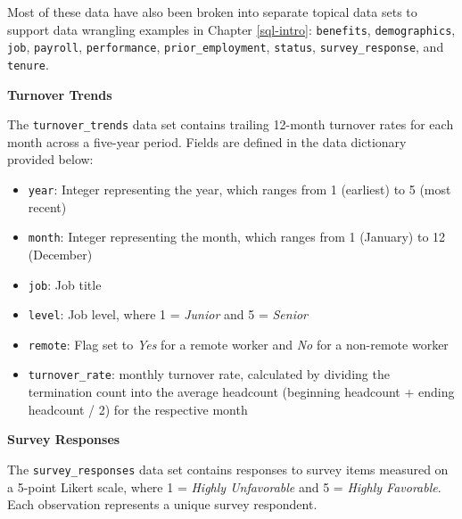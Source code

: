 \documentclass[
]{book}
\providecommand{\tightlist}{%
  \setlength{\itemsep}{0pt}\setlength{\parskip}{0pt}}
\begin{document}
Most of these data have also been broken into separate topical data sets to support data wrangling examples in Chapter \ref{sql-intro}: \texttt{benefits}, \texttt{demographics}, \texttt{job}, \texttt{payroll}, \texttt{performance}, \texttt{prior\_employment}, \texttt{status}, \texttt{survey\_response}, and \texttt{tenure}.

\textbf{Turnover Trends}

The \texttt{turnover\_trends} data set contains trailing 12-month turnover rates for each month across a five-year period. Fields are defined in the data dictionary provided below:

\begin{itemize}
\tightlist
\item
  \texttt{year}: Integer representing the year, which ranges from 1 (earliest) to 5 (most recent)
\item
  \texttt{month}: Integer representing the month, which ranges from 1 (January) to 12 (December)
\item
  \texttt{job}: Job title
\item
  \texttt{level}: Job level, where 1 = \emph{Junior} and 5 = \emph{Senior}
\item
  \texttt{remote}: Flag set to \emph{Yes} for a remote worker and \emph{No} for a non-remote worker
\item
  \texttt{turnover\_rate}: monthly turnover rate, calculated by dividing the termination count into the average headcount (beginning headcount + ending headcount / 2) for the respective month
\end{itemize}

\textbf{Survey Responses}

The \texttt{survey\_responses} data set contains responses to survey items measured on a 5-point Likert scale, where 1 = \emph{Highly Unfavorable} and 5 = \emph{Highly Favorable}. Each observation represents a unique survey respondent.
\end{document}
